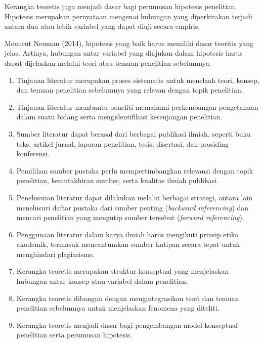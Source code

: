 \documentclass[
  indonesian,
  letterpaper,
  DIV=11,
  numbers=noendperiod]{scrreprt}
\providecommand{\tightlist}{%
  \setlength{\itemsep}{0pt}\setlength{\parskip}{0pt}}
\begin{document}
\begin{enumerate}
  Kerangka teoretis juga menjadi dasar bagi perumusan hipotesis
  penelitian. Hipotesis merupakan pernyataan mengenai hubungan yang
  diperkirakan terjadi antara dua atau lebih variabel yang dapat diuji
  secara empiris.

  Menurut Neuman (2014), hipotesis yang baik harus memiliki dasar
  teoritis yang jelas. Artinya, hubungan antar variabel yang diajukan
  dalam hipotesis harus dapat dijelaskan melalui teori atau temuan
  penelitian sebelumnya.
\end{enumerate}

\begin{tcolorbox}[enhanced jigsaw, colframe=quarto-callout-tip-color-frame, toptitle=1mm, breakable, leftrule=.75mm, arc=.35mm, toprule=.15mm, colback=white, colbacktitle=quarto-callout-tip-color!10!white, bottomtitle=1mm, bottomrule=.15mm, titlerule=0mm, title=\textcolor{quarto-callout-tip-color}{\faLightbulb}\hspace{0.5em}{Rangkuman}, coltitle=black, left=2mm, opacitybacktitle=0.6, opacityback=0, rightrule=.15mm]

\begin{enumerate}
\def\labelenumi{\arabic{enumi}.}
\tightlist
\item
  Tinjauan literatur merupakan proses sistematis untuk menelaah teori,
  konsep, dan temuan penelitian sebelumnya yang relevan dengan topik
  penelitian.
\item
  Tinjauan literatur membantu peneliti memahami perkembangan pengetahuan
  dalam suatu bidang serta mengidentifikasi kesenjangan penelitian.
\item
  Sumber literatur dapat berasal dari berbagai publikasi ilmiah, seperti
  buku teks, artikel jurnal, laporan penelitian, tesis, disertasi, dan
  prosiding konferensi.
\item
  Pemilihan sumber pustaka perlu mempertimbangkan relevansi dengan topik
  penelitian, kemutakhiran sumber, serta kualitas ilmiah publikasi.
\item
  Penelusuran literatur dapat dilakukan melalui berbagai strategi,
  antara lain menelusuri daftar pustaka dari sumber penting
  (\emph{backward referencing}) dan mencari penelitian yang mengutip
  sumber tersebut (\emph{forward referencing}).
\item
  Penggunaan literatur dalam karya ilmiah harus mengikuti prinsip etika
  akademik, termasuk mencantumkan sumber kutipan secara tepat untuk
  menghindari plagiarisme.
\item
  Kerangka teoretis merupakan struktur konseptual yang menjelaskan
  hubungan antar konsep atau variabel dalam penelitian.
\item
  Kerangka teoretis dibangun dengan mengintegrasikan teori dan temuan
  penelitian sebelumnya untuk menjelaskan fenomena yang diteliti.
\item
  Kerangka teoretis menjadi dasar bagi pengembangan model konseptual
  penelitian serta perumusan hipotesis.
\end{enumerate}

\end{tcolorbox}
\end{document}
